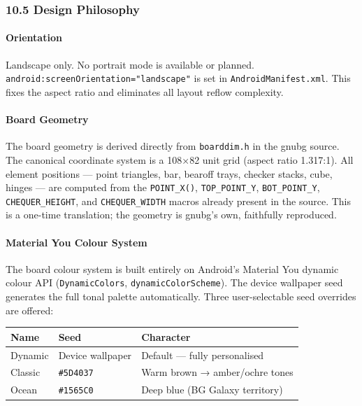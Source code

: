 \documentclass[11pt,a4paper]{article}
\begin{document}
\subsubsection{10.5 Design Philosophy}\label{design-philosophy}

\paragraph{Orientation}\label{orientation}

Landscape only. No portrait mode is available or planned.
\texttt{android:screenOrientation="landscape"} is set in
\texttt{AndroidManifest.xml}. This fixes the aspect ratio and eliminates
all layout reflow complexity.

\paragraph{Board Geometry}\label{board-geometry}

The board geometry is derived directly from \texttt{boarddim.h} in the
gnubg source. The canonical coordinate system is a 108×82 unit grid
(aspect ratio 1.317:1). All element positions --- point triangles, bar,
bearoff trays, checker stacks, cube, hinges --- are computed from the
\texttt{POINT\_X()}, \texttt{TOP\_POINT\_Y}, \texttt{BOT\_POINT\_Y},
\texttt{CHEQUER\_HEIGHT}, and \texttt{CHEQUER\_WIDTH} macros already
present in the source. This is a one-time translation; the geometry is
gnubg's own, faithfully reproduced.

\paragraph{Material You Colour
System}\label{material-you-colour-system}

The board colour system is built entirely on Android's Material You
dynamic colour API (\texttt{DynamicColors}, \texttt{dynamicColorScheme}).
The device wallpaper seed generates the full tonal palette
automatically. Three user-selectable seed overrides are offered:

\begin{longtable}[]{@{}lll@{}}
\toprule\noalign{}
Name & Seed & Character \\
\midrule\noalign{}
\endhead
\bottomrule\noalign{}
\endlastfoot
Dynamic & Device wallpaper & Default --- fully personalised \\
Classic & \texttt{\#5D4037} & Warm brown → amber/ochre tones \\
Ocean & \texttt{\#1565C0} & Deep blue (BG Galaxy territory) \\
\end{longtable}
\end{document}
